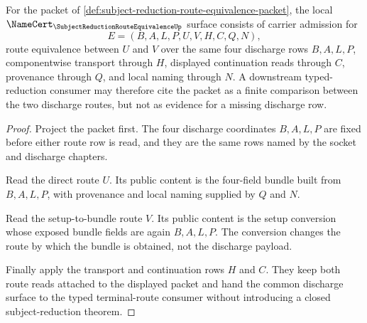 \begin{theorem}
\label{thm:subject-reduction-route-equivalence-namecert}
For the packet of \autoref{def:subject-reduction-route-equivalence-packet}, the local $\NameCert_{\SubjectReductionRouteEquivalenceUp}$ surface consists of carrier admission for
$$
E=(B,A,L,P,U,V,H,C,Q,N),
$$
route equivalence between $U$ and $V$ over the same four discharge rows $B,A,L,P$, componentwise transport through $H$, displayed continuation reads through $C$, provenance through $Q$, and local naming through $N$. A downstream typed-reduction consumer may therefore cite the packet as a finite comparison between the two discharge routes, but not as evidence for a missing discharge row.
\end{theorem}
\begin{proof}
Project the packet first. The four discharge coordinates $B,A,L,P$ are fixed before either route row is read, and they are the same rows named by the socket and discharge chapters.

Read the direct route $U$. Its public content is the four-field bundle built from $B,A,L,P$, with provenance and local naming supplied by $Q$ and $N$.

Read the setup-to-bundle route $V$. Its public content is the setup conversion whose exposed bundle fields are again $B,A,L,P$. The conversion changes the route by which the bundle is obtained, not the discharge payload.

Finally apply the transport and continuation rows $H$ and $C$. They keep both route reads attached to the displayed packet and hand the common discharge surface to the typed terminal-route consumer without introducing a closed subject-reduction theorem.
\end{proof}

